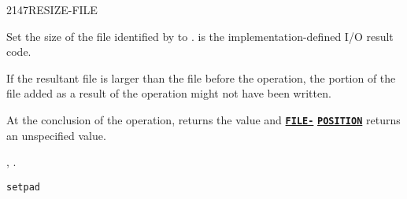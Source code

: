 \begin{worddef}{2147}{RESIZE-FILE}
\item {}

	Set the size of the file identified by  to
	.  is the implementation-defined I/O result
	code.

	If the resultant file is larger than the file before the
	operation, the portion of the file added as a result of the
	operation might not have been written.

	At the conclusion of the operation,  returns
	the value  and
	\hyperref{}{file}{FILE-POSITION}{\textbf{\texttt{FILE-}}} \linebreak
	\hyperref{}{file}{FILE-POSITION}{\textbf{\texttt{POSITION}}}
	returns an unspecified value.

\see {},
	.

	\begin{testing}
		\texttt{setpad} \\
		 \\
		 \\
		 \\
		 \\
		 \\
		 \\
		 \\
		 \\
		 \\
		 \\
		 \\
		 \\
	\end{testing}
\end{worddef}


